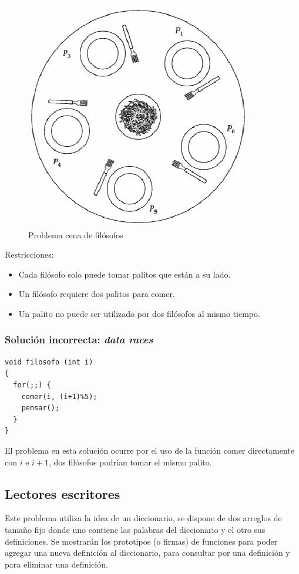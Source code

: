 \begin{figure}[htbp]
\centering
\includegraphics[scale=1.00]{img/C05_sincronizacion/filosofos.png}
\caption{Problema cena de filósofos}
\label{fig:concurrencia_filosofos}
\end{figure}

Restricciones:
\begin{itemize}
\item Cada filósofo solo puede tomar palitos que están a su lado.
\item Un filósofo requiere dos palitos para comer.
\item Un palito no puede ser utilizado por dos filósofos al mismo tiempo.
\end{itemize}

\subsubsection{Solución incorrecta: \emph{data races}}
\begin{lstlisting}
void filosofo (int i)
{
  for(;;) {
    comer(i, (i+1)%5);
    pensar();
  }
}
\end{lstlisting}

El problema en esta solución ocurre por el uso de la función comer
directamente con $i$ e $i+1$, dos filósofos podrían tomar el mismo palito.

\subsection{Lectores escritores}
Este problema utiliza la idea de un diccionario, se dispone de dos arreglos de
tamaño fijo donde uno contiene las palabras del diccionario y el otro sus
definiciones. Se mostrarán los prototipos (o firmas) de funciones para poder
agregar una nueva definición al diccionario, para consultar por una definición y
para eliminar una definición.

